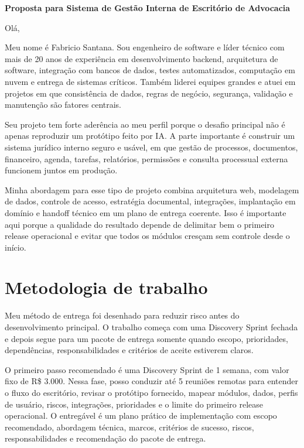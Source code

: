 \documentclass[11pt,a4paper]{article}
\begin{document}
\begin{center}
{\LARGE\bfseries Proposta para Sistema de Gestão Interna de Escritório de Advocacia}
\end{center}
\vspace{0.5em}

Olá,\par

Meu nome é Fabricio Santana. Sou engenheiro de software e líder técnico com mais de 20 anos de experiência em desenvolvimento backend, arquitetura de software, integração com bancos de dados, testes automatizados, computação em nuvem e entrega de sistemas críticos. Também liderei equipes grandes e atuei em projetos em que consistência de dados, regras de negócio, segurança, validação e manutenção são fatores centrais.\par

Seu projeto tem forte aderência ao meu perfil porque o desafio principal não é apenas reproduzir um protótipo feito por IA. A parte importante é construir um sistema jurídico interno seguro e usável, em que gestão de processos, documentos, financeiro, agenda, tarefas, relatórios, permissões e consulta processual externa funcionem juntos em produção.\par

Minha abordagem para esse tipo de projeto combina arquitetura web, modelagem de dados, controle de acesso, estratégia documental, integrações, implantação em domínio e handoff técnico em um plano de entrega coerente. Isso é importante aqui porque a qualidade do resultado depende de delimitar bem o primeiro release operacional e evitar que todos os módulos cresçam sem controle desde o início.\par

\section*{Metodologia de trabalho}

Meu método de entrega foi desenhado para reduzir risco antes do desenvolvimento principal. O trabalho começa com uma Discovery Sprint fechada e depois segue para um pacote de entrega somente quando escopo, prioridades, dependências, responsabilidades e critérios de aceite estiverem claros.\par

O primeiro passo recomendado é uma Discovery Sprint de 1 semana, com valor fixo de R\$ 3.000. Nessa fase, posso conduzir até 5 reuniões remotas para entender o fluxo do escritório, revisar o protótipo fornecido, mapear módulos, dados, perfis de usuário, riscos, integrações, prioridades e o limite do primeiro release operacional. O entregável é um plano prático de implementação com escopo recomendado, abordagem técnica, marcos, critérios de sucesso, riscos, responsabilidades e recomendação do pacote de entrega.\par
\end{document}
